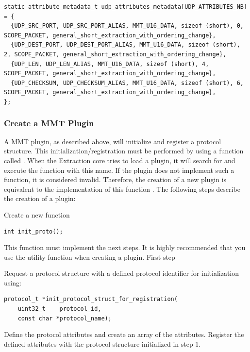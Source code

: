 \begin{lstlisting}[style=Cpp]
static attribute_metadata_t udp_attributes_metadata[UDP_ATTRIBUTES_NB] = {
  {UDP_SRC_PORT, UDP_SRC_PORT_ALIAS, MMT_U16_DATA, sizeof (short), 0, SCOPE_PACKET, general_short_extraction_with_ordering_change},
  {UDP_DEST_PORT, UDP_DEST_PORT_ALIAS, MMT_U16_DATA, sizeof (short), 2, SCOPE_PACKET, general_short_extraction_with_ordering_change},
  {UDP_LEN, UDP_LEN_ALIAS, MMT_U16_DATA, sizeof (short), 4, SCOPE_PACKET, general_short_extraction_with_ordering_change},
  {UDP_CHECKSUM, UDP_CHECKSUM_ALIAS, MMT_U16_DATA, sizeof (short), 6, SCOPE_PACKET, general_short_extraction_with_ordering_change},
};
\end{lstlisting}

\subsubsection{Create a MMT Plugin}

A MMT plugin, as described above, will initialize and register a protocol structure. This initialization/registration must be performed by using a function called . When the Extraction core tries to load a plugin, it will search for and execute the function with this name. If the plugin does not implement such a function, it is considered invalid. Therefore, the creation of a new plugin is equivalent to the implementation of this function . 
The following steps describe the creation of a plugin:

Create a new function 

\begin{lstlisting}[style=Cpp]
int init_proto();
\end{lstlisting}

This function must implement the next steps. It is highly recommended that you use the utility function when creating a plugin. 
First step

Request a protocol structure with a defined protocol identifier for initialization using: 
\begin{lstlisting}[style=Cpp]
protocol_t *init_protocol_struct_for_registration(
    uint32_t    protocol_id, 
    const char *protocol_name);
\end{lstlisting}

Define the protocol attributes and create an array of the attributes. Register the defined attributes with the protocol structure initialized in step 1. 

